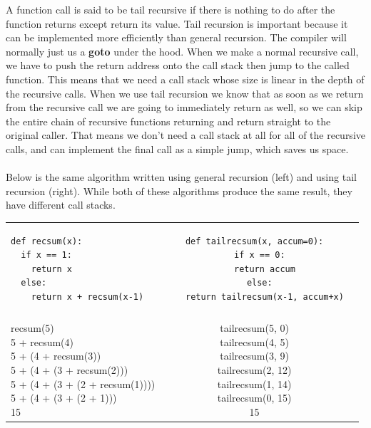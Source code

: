 \documentclass[9pt]{extarticle} %
\begin{document}
\begin{minipage}[t]{.66\linewidth} %
\vspace{-0.4cm}
\hypertarget{firstnews}{}
	A function call is said to be tail recursive if there is nothing to do after the function returns except return its value. Tail recursion is important because it can be implemented more efficiently than general recursion. The compiler will normally just us a \textbf{goto} under the hood. When we make a normal recursive call, we have to push the return address onto the call stack then jump to the called function. This means that we need a call stack whose size is linear in the depth of the recursive calls. When we use tail recursion we know that as soon as we return from the recursive call we are going to immediately return as well, so we can skip the entire chain of recursive functions returning and return straight to the original caller. That means we don't need a call stack at all for all of the	recursive calls, and can implement the final call as a simple jump, which saves us space. \\
\\
Below is the same algorithm written using general recursion (left) and using tail recursion (right). While both of these algorithms produce the same result, they have different call stacks. \\

\begin{tabular}{ l c r }
\begin{lstlisting}
def recsum(x):
  if x == 1:
    return x
  else:
    return x + recsum(x-1)
\end{lstlisting}
&
\begin{lstlisting}
def tailrecsum(x, accum=0):
  if x == 0:
    return accum
  else:
    return tailrecsum(x-1, accum+x)
\end{lstlisting}
\\
\\
\makecell{
recsum(5) \\
5 + recsum(4) \\
5 + (4 + recsum(3)) \\
5 + (4 + (3 + recsum(2))) \\
5 + (4 + (3 + (2 + recsum(1)))) \\
5 + (4 + (3 + (2 + 1))) \\
15 \\}

&
\makecell{
tailrecsum(5, 0) \\
tailrecsum(4, 5) \\
tailrecsum(3, 9) \\
tailrecsum(2, 12) \\
tailrecsum(1, 14) \\
tailrecsum(0, 15) \\
15 \\}
\end{tabular}


\end{minipage}
\end{document}
